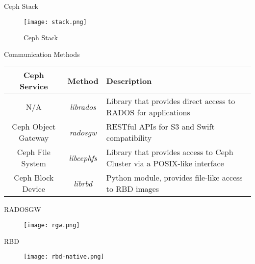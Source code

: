 %    

%   

\begin{frame}[t]{Ceph Stack}
    \begin{figure}[htpb]
        \centering
        \texttt{[image: stack.png]}
        \caption{Ceph Stack}
        \label{fig:stack}
    \end{figure}
\end{frame}

\begin{frame}{Communication Methods}
    \begin{tabular}{|c|c|p{}|}
    \hline
        \textbf{Ceph Service}    &   \textbf{Method}  &   \textbf{Description} \\
    \hline
        N/A &   \textit{librados}   &   Library that provides direct access to RADOS for applications \\
    \hline
        Ceph Object Gateway &   \textit{radosgw}    &   RESTful APIs for S3 and Swift compatibility \\
    \hline
        Ceph File System  &   \textit{libcephfs}  &   Library that provides access to Ceph Cluster via a POSIX-like interface \\
    \hline
        Ceph Block Device & \textit{librbd} &   Python module, provides file-like access to RBD images \\
    \hline
    \end{tabular}
\end{frame}

\begin{frame}{RADOSGW}
    \begin{figure}[htpb]
        \centering
        \texttt{[image: rgw.png]}
    \end{figure}
\end{frame}

\begin{frame}{RBD}
    \begin{figure}[htpb]
        \centering
        \texttt{[image: rbd-native.png]}
    \end{figure}
\end{frame}

